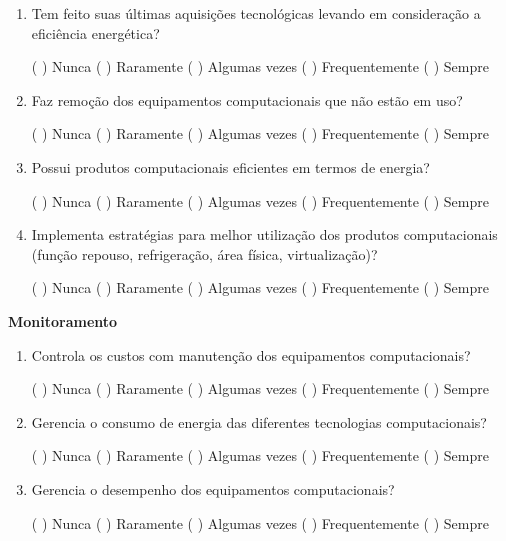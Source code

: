 \begin{apendicesenv}
\begin{enumerate}
    \item Tem feito suas últimas aquisições tecnológicas levando em consideração a eficiência energética? 
    
    ( \space\space ) Nunca  ( \space\space ) Raramente  ( \space\space ) Algumas vezes  ( \space\space ) Frequentemente ( \space\space ) Sempre
    \item Faz remoção dos equipamentos computacionais que não estão em uso? 
    
    ( \space\space ) Nunca  ( \space\space ) Raramente  ( \space\space ) Algumas vezes  ( \space\space ) Frequentemente ( \space\space ) Sempre
    \item Possui produtos computacionais eficientes em termos de energia? 
    
    ( \space\space ) Nunca  ( \space\space ) Raramente  ( \space\space ) Algumas vezes  ( \space\space ) Frequentemente ( \space\space ) Sempre
    \item Implementa estratégias para melhor utilização dos produtos computacionais (função repouso, refrigeração, área física, virtualização)? 
    
    ( \space\space ) Nunca  ( \space\space ) Raramente  ( \space\space ) Algumas vezes  ( \space\space ) Frequentemente ( \space\space ) Sempre
\end{enumerate}
    
\textbf{Monitoramento}

\begin{enumerate}
    \item Controla os custos com manutenção dos equipamentos computacionais? 
    
    ( \space\space ) Nunca  ( \space\space ) Raramente  ( \space\space ) Algumas vezes  ( \space\space ) Frequentemente ( \space\space ) Sempre
    \item Gerencia o consumo de energia das diferentes tecnologias computacionais? 
    
    ( \space\space ) Nunca  ( \space\space ) Raramente  ( \space\space ) Algumas vezes  ( \space\space ) Frequentemente ( \space\space ) Sempre
    \item Gerencia o desempenho dos equipamentos computacionais? 
    
    ( \space\space ) Nunca  ( \space\space ) Raramente  ( \space\space ) Algumas vezes  ( \space\space ) Frequentemente ( \space\space ) Sempre
\end{enumerate}
    

\end{apendicesenv}
